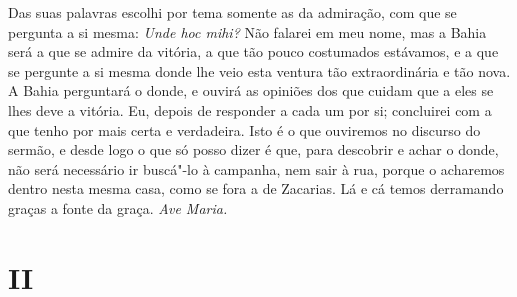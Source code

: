 Das suas palavras escolhi por tema somente as da admiração, com que se
pergunta a si mesma: \emph{Unde hoc mihi?} Não falarei em meu nome, mas
a Bahia será a que se admire da vitória, a que tão pouco costumados
estávamos, e a que se pergunte a si mesma donde lhe veio esta ventura
tão extraordinária e tão nova. A Bahia perguntará o donde, e ouvirá as
opiniões dos que cuidam que a eles se lhes deve a vitória. Eu, depois de
responder a cada um por si; concluirei com a que tenho por mais certa e
verdadeira. Isto é o que ouviremos no discurso do sermão, e desde logo o
que só posso dizer é que, para descobrir e achar o donde, não será
necessário ir buscá"-lo à campanha, nem sair à rua, porque o acharemos
dentro nesta mesma casa, como se fora a de Zacarias. Lá e cá temos
derramando graças a fonte da graça. \emph{Ave Maria.}

\section{II}

